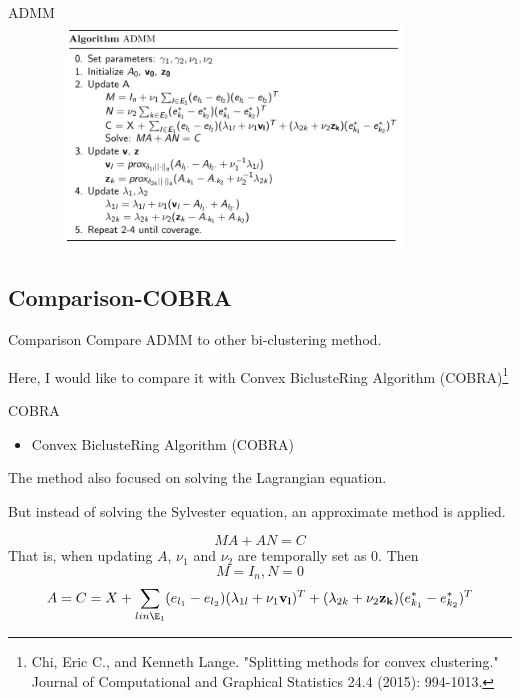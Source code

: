 \documentclass{beamer}
\begin{document}
\begin{frame}{ADMM}
    \centering
    \includegraphics[width=12cm,height=6cm,keepaspectratio]{algo}
\end{frame}



\subsection{Comparison-COBRA}

\begin{frame}{Comparison}
    Compare ADMM to other bi-clustering method.
    
    Here, I would like to compare it with Convex BiclusteRing Algorithm (COBRA)\footnote{Chi, Eric C., and Kenneth Lange. "Splitting methods for convex clustering." Journal of Computational and Graphical Statistics 24.4 (2015): 994-1013.}
    
    
\end{frame}

\begin{frame}{COBRA}
    \begin{itemize}
        \item Convex BiclusteRing Algorithm (COBRA)
    \end{itemize}
     
    The method also focused on solving the Lagrangian equation. 
    
    But instead of solving the Sylvester equation, an approximate method is applied. 
    
    \begin{equation}
    MA + AN = C \tag{1}
\end{equation}
  That is, when updating $A$, $\nu_1$ and $\nu_2$ are temporally set as 0.   
  Then
  $$M = I_n, N = 0$$
  $$A = C = X + \sum_{l in \E_1} (e_{l_1} - e_{l_2})(\lambda_{1l} + \nu_1 \mathbf{v_l})^T    + (\lambda_{2k} + \nu_2 \mathbf{z_k}) (e^{*}_{k_1} - e^{*}_{k_2})^T $$

\end{frame}
\end{document}
